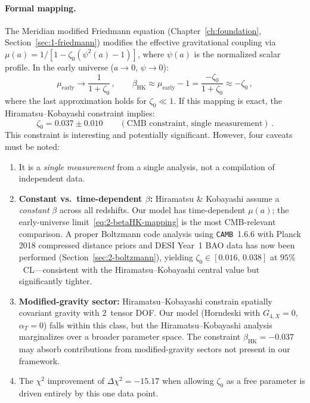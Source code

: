 \paragraph{Formal mapping.} The Meridian modified Friedmann equation (Chapter~\ref{ch:foundation}, Section~\ref{sec:1-friedmann}) modifies the effective gravitational coupling via $\mu(a) = 1/[1 - \zeta_0(\psi^2(a) - 1)]$, where $\psi(a)$ is the normalized scalar profile. In the early universe ($a \to 0$, $\psi \to 0$):
\begin{equation}
  \mu_{\mathrm{early}} \to \frac{1}{1 + \zeta_0}\,,\qquad
  \beta_{\mathrm{HK}} \approx \mu_{\mathrm{early}} - 1 = \frac{-\zeta_0}{1 + \zeta_0} \approx -\zeta_0\,,
  \label{eq:2-betaHK-mapping}
\end{equation}
where the last approximation holds for $\zeta_0 \ll 1$. If this mapping is exact, the Hiramatsu--Kobayashi constraint implies:
\begin{equation}
\zeta_0 = 0.037 \pm 0.010 \qquad (\text{CMB constraint, single measurement})\,.
\label{eq:2-zeta0-CMB}
\end{equation}
This constraint is interesting and potentially significant. However, four caveats must be noted:
\begin{enumerate}
    \item It is a \emph{single measurement} from a single analysis, not a compilation of independent data.
    \item \textbf{Constant vs.\ time-dependent $\beta$:} Hiramatsu \& Kobayashi assume a \emph{constant} $\beta$ across all redshifts. Our model has time-dependent $\mu(a)$; the early-universe limit~\eqref{eq:2-betaHK-mapping} is the most CMB-relevant comparison. A proper Boltzmann code analysis using \texttt{CAMB}~1.6.6 with Planck 2018 compressed distance priors and DESI Year~1 BAO data has now been performed (Section~\ref{sec:2-boltzmann}), yielding $\zeta_0 \in [0.016,\,0.038]$ at $95\%$~CL---consistent with the Hiramatsu--Kobayashi central value but significantly tighter.
    \item \textbf{Modified-gravity sector:} Hiramatsu--Kobayashi constrain spatially covariant gravity with 2~tensor DOF. Our model (Horndeski with $G_{4,X} = 0$, $\alpha_T = 0$) falls within this class, but the Hiramatsu--Kobayashi analysis marginalizes over a broader parameter space. The constraint $\beta_{\mathrm{HK}} = -0.037$ may absorb contributions from modified-gravity sectors not present in our framework.
    \item The $\chi^2$ improvement of $\Delta\chi^2 = -15.17$ when allowing $\zeta_0$ as a free parameter is driven entirely by this one data point.
\end{enumerate}

